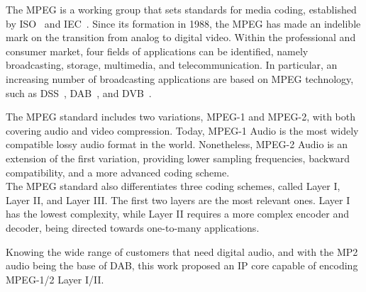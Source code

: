 
The MPEG is a working group that sets standards for media coding, established by ISO~\cite{iso} and IEC~\cite{iec}. Since its formation in 1988, the MPEG has made an indelible mark on the transition from analog to digital video.
Within the professional and consumer market, four fields of applications can be identified, namely broadcasting, storage, multimedia, and telecommunication. In particular, an increasing number of broadcasting applications are based on MPEG technology, such as DSS~\cite{dss}, DAB~\cite{dab}, and DVB~\cite{dvb}.

The MPEG standard includes two variations, MPEG-1 and MPEG-2, with both covering audio and video compression.
Today, MPEG-1 Audio is the most widely compatible lossy audio format in the world. Nonetheless, MPEG-2 Audio is an extension of the first variation, providing lower sampling frequencies, backward compatibility, and a more advanced coding scheme.\\
The MPEG standard also differentiates three coding schemes, called Layer I, Layer II, and Layer III.
The first two layers are the most relevant ones. Layer I has the lowest complexity, while Layer II requires a more complex encoder and decoder, being directed towards one-to-many applications.

Knowing the wide range of customers that need digital audio, and with the MP2 audio being the base of DAB, this work proposed an IP core capable of encoding MPEG-1/2 Layer I/II. 

